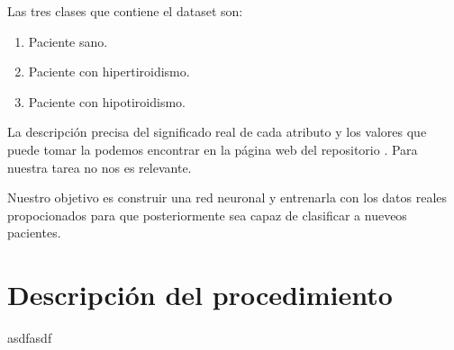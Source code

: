 \documentclass[a4paper,12pt,titlepage]{article}
\begin{document}
\newpage

Las tres clases que contiene el dataset son:

\begin{enumerate}[noitemsep]
	\item Paciente sano.
	\item Paciente con hipertiroidismo.
	\item Paciente con hipotiroidismo.
\end{enumerate}

La descripción precisa del significado real de cada atributo y los valores que puede tomar la podemos encontrar en la página web del repositorio \citep{Asuncion+Newman:2007}. Para nuestra tarea no nos es relevante.

Nuestro objetivo es construir una red neuronal y entrenarla con los datos reales propocionados para que posteriormente sea capaz de clasificar a nueveos pacientes. 

\section{Descripción del procedimiento}

asdfasdf
\end{document}

